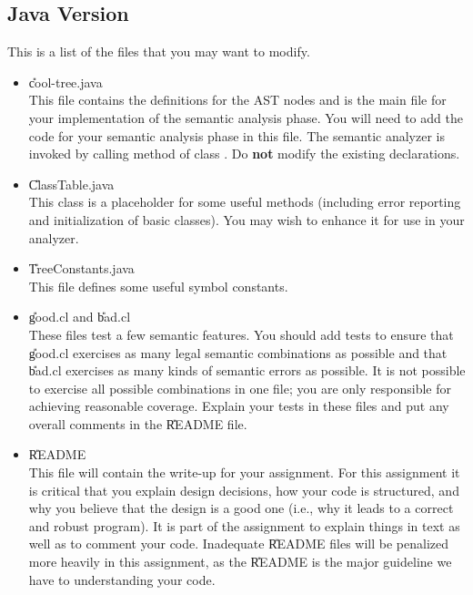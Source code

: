 \documentclass[11pt]{article}
\begin{document}
\subsection{Java Version}

This is a list of the files that you may want to modify.

\begin{itemize}
\item \U{cool-tree.java} \\
This file contains the definitions for the AST nodes and is the
main file for your implementation of the semantic analysis phase.
You will need to
add the code for your semantic analysis phase in this file.  The
semantic analyzer is invoked by calling method  of class
. Do {\bf not} modify the existing declarations.

\item \U{ClassTable.java} \\
This class is a placeholder for some useful methods (including
error reporting and initialization of basic classes).  You may wish to
enhance it for use in your analyzer.

\item \U{TreeConstants.java} \\
This file defines some useful symbol constants.

\item \U{good.cl} and \U{bad.cl} \\
These files test a few semantic features.  You should add tests to
ensure that \U{good.cl} exercises as many legal semantic combinations as
possible and that \U{bad.cl} exercises as many kinds of semantic errors
as possible.  It is not possible to exercise all possible combinations
in one file; you are only responsible for achieving reasonable coverage.
Explain your tests in these files and put any overall comments in the
\U{README} file.

\item \U{README} \\
This file will contain the write-up for your assignment.  For this
assignment it is critical that you explain design decisions, how your
code is structured, and why you believe that the design is a good one
(i.e., why it leads to a correct and robust program).  It is part of the
assignment to explain things in text as well as to comment your code.
Inadequate \U{README} files will be penalized more heavily in this
assignment, as the \U{README} is the major guideline we have to
understanding your code.


\end{itemize}
\end{document}
